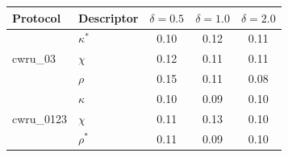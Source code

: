 \begin{tabular}{llccc}
\toprule
Protocol & Descriptor & $\delta{=}0.5$ & $\delta{=}1.0$ & $\delta{=}2.0$ \\
\midrule
\multirow{3}{*}{cwru\_03} & $\kappa$$^{*}$ & 0.10 & 0.12 & 0.11 \\
 & $\chi$ & 0.12 & 0.11 & 0.11 \\
 & $\rho$ & 0.15 & 0.11 & 0.08 \\
\cmidrule(lr){1-5}
\multirow{3}{*}{cwru\_0123} & $\kappa$ & 0.10 & 0.09 & 0.10 \\
 & $\chi$ & 0.11 & 0.13 & 0.10 \\
 & $\rho$$^{*}$ & 0.11 & 0.09 & 0.10 \\
\bottomrule
\end{tabular}
